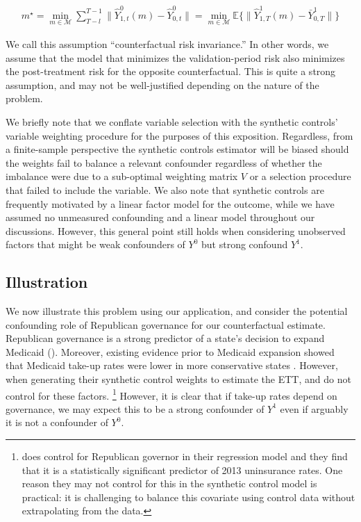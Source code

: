 \begin{align*}\label{assumption:second}
m^\star = \min_{m \in \mathcal{M}}\sum_{T - l}^{T-1}\|\hat{Y}^0_{1, t}(m) - \hat{Y}^0_{0, t}\| = \min_{m \in \mathcal{M}}\mathbb{E}\{\|\hat{Y}^1_{1, T}(m) - \bar{Y}^1_{0, T}\|\}
\end{align*}

We call this assumption ``counterfactual risk invariance.'' In other words, we assume that the model that minimizes the validation-period risk also minimizes the post-treatment risk for the opposite counterfactual. This is quite a strong assumption, and may not be well-justified depending on the nature of the problem. 

We briefly note that we conflate variable selection with the synthetic controls' variable weighting procedure for the purposes of this exposition. Regardless, from a finite-sample perspective the synthetic controls estimator will be biased should the weights fail to balance a relevant confounder regardless of whether the imbalance were due to a sub-optimal weighting matrix $V$ or a selection procedure that failed to include the variable. We also note that synthetic controls are frequently motivated by a linear factor model for the outcome, while we have assumed no unmeasured confounding and a linear model throughout our discussions. However, this general point still holds when considering unobserved factors that might be weak confounders of $Y^0$ but strong confound $Y^1$.

\subsection{Illustration}

We now illustrate this problem using our application, and consider the potential confounding role of Republican governance for our counterfactual estimate. Republican governance is a strong predictor of a state's decision to expand Medicaid (\cite{courtemanche2017early}). Moreover, existing evidence prior to Medicaid expansion showed that Medicaid take-up rates were lower in more conservative states \cite{sommers2012understanding}. However, when generating their synthetic control weights to estimate the ETT, \cite{courtemanche2017early} and \cite{kaestner2017effects} do not control for these factors. \footnote{\cite{courtemanche2017early} does control for Republican governor in their regression model and they find that it is a statistically significant predictor of 2013 uninsurance rates. One reason they may not control for this in the synthetic control model is practical: it is challenging to balance this covariate using control data without extrapolating from the data.} However, it is clear that if take-up rates depend on governance, we may expect this to be a strong confounder of $Y^1$  even if arguably it is not a confounder of $Y^0$.

